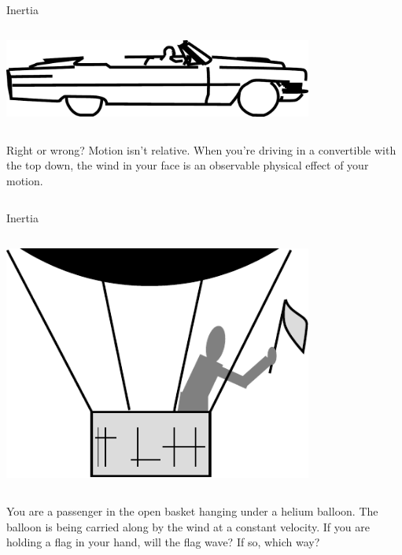\begin{frame}{Inertia}
  \begin{mycolumns}

    \begin{column}{.5\textwidth}\includegraphics[width=4in]{ch01/figs/convertible}\end{column}

    \begin{column}{.5\textwidth}
      \dq

      Right or wrong? Motion isn't relative.
      When you're driving in a convertible with the top down, the wind in
      your face is an observable physical effect of your motion.
    \end{column}
  \end{mycolumns}


\end{frame}


\begin{frame}{Inertia}
  \begin{mycolumns}

    \begin{column}{.4\textwidth}\includegraphics[width=4in]{ch01/figs/flag-in-balloon}\end{column}

    \begin{column}{.6\textwidth}
      \dq

You are a passenger in the open basket hanging under a
helium balloon. The balloon is being carried along by the
wind at a constant velocity. If you are holding a flag in
your hand, will the flag wave? If so, which way?



    \end{column}
  \end{mycolumns}
\end{frame}

